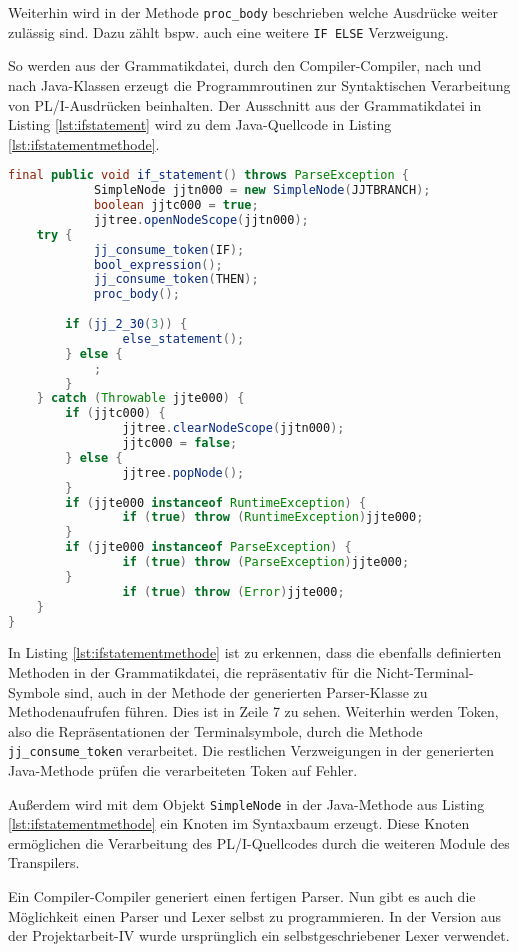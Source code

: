Weiterhin wird in der Methode \verb+proc_body+ beschrieben welche Ausdrücke weiter zulässig sind. Dazu zählt bspw. auch eine weitere \verb+IF ELSE+ Verzweigung. 

 So werden aus der Grammatikdatei, durch den Compiler-Compiler, nach und nach Java-Klassen erzeugt die Programmroutinen zur Syntaktischen Verarbeitung von PL/I-Ausdrücken beinhalten.
Der Ausschnitt aus der Grammatikdatei in Listing \ref{lst:ifstatement} wird zu dem Java-Quellcode in Listing \ref{lst:ifstatementmethode}.


\begin{lstlisting}[language=Java, caption=Verkürzte If-Statement Methode aus dem Parser, label={lst:ifstatementmethode}]
 final public void if_statement() throws ParseException {
			SimpleNode jjtn000 = new SimpleNode(JJTBRANCH);
			boolean jjtc000 = true;
			jjtree.openNodeScope(jjtn000);
	try {
			jj_consume_token(IF);
			bool_expression();
			jj_consume_token(THEN);
			proc_body();
		
		if (jj_2_30(3)) {
				else_statement();
		} else {
			;
		}
	} catch (Throwable jjte000) {
		if (jjtc000) {
				jjtree.clearNodeScope(jjtn000);
				jjtc000 = false;
		} else {
				jjtree.popNode();
		}
		if (jjte000 instanceof RuntimeException) {
				if (true) throw (RuntimeException)jjte000;
		}
		if (jjte000 instanceof ParseException) {
				if (true) throw (ParseException)jjte000;
		}
				if (true) throw (Error)jjte000;
	}
}	
\end{lstlisting}

In Listing \ref{lst:ifstatementmethode} ist zu erkennen, dass die ebenfalls definierten Methoden in der Grammatikdatei, die repräsentativ für die Nicht-Terminal-Symbole sind, auch in der Methode der generierten Parser-Klasse zu Methodenaufrufen führen. Dies ist in Zeile 7 zu sehen. Weiterhin werden Token, also die Repräsentationen der Terminalsymbole, durch die Methode \verb+jj_consume_token+ verarbeitet. Die restlichen Verzweigungen in der generierten Java-Methode prüfen die verarbeiteten Token auf Fehler.

Außerdem wird mit dem Objekt \verb+SimpleNode+ in der Java-Methode aus Listing \ref{lst:ifstatementmethode} ein Knoten im Syntaxbaum erzeugt. Diese Knoten ermöglichen die Verarbeitung des PL/I-Quellcodes durch die weiteren Module des Transpilers.


Ein Compiler-Compiler generiert einen fertigen Parser. Nun gibt es auch die Möglichkeit einen Parser und Lexer selbst zu programmieren. In der Version aus der Projektarbeit-IV wurde ursprünglich ein selbstgeschriebener Lexer verwendet.

